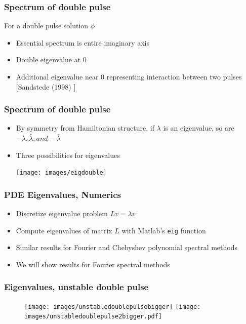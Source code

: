 \documentclass[16pt]{beamer}
\begin{document}
\begin{frame}
	\frametitle{Spectrum of double pulse}
	\fontsize{16}{7.2}\selectfont
	For a double pulse solution $\phi$
	\vspace{0.5cm}
	\begin{itemize}
		\item Essential spectrum is entire imaginary axis
		\vspace{0.5cm}
		\item Double eigenvalue at 0
		\vspace{0.5cm}
		\item Additional eigenvalue near 0 representing interaction between two pulses \footnotesize [Sandstede (1998) ]
	\end{itemize}
\end{frame}

\begin{frame}
	\frametitle{Spectrum of double pulse}
	\fontsize{16}{7.2}\selectfont
	\begin{itemize}
		\item By symmetry from Hamiltonian structure, if $\lambda$ is an eigenvalue, so are $-\lambda, \bar{\lambda}, and -\bar{\lambda}$
		\vspace{0.5cm}
		\item Three possibilities for eigenvalues
		\begin{center}
			\texttt{[image: images/eigdouble]}
		\end{center}
	\end{itemize}
\end{frame}

\begin{frame}
	\frametitle{PDE Eigenvalues, Numerics}
	\fontsize{16}{7.2}\selectfont
	\begin{itemize}
		\item Discretize eigenvalue problem $Lv = \lambda v$
		\vspace{0.5cm}
		\item Compute eigenvalues of matrix $L$ with Matlab's \texttt{eig} function
		\vspace{0.5cm}
		\item Similar results for Fourier and Chebyshev polynomial spectral methods
		\vspace{0.5cm}
		\item We will show results for Fourier spectral methods
	\end{itemize}
\end{frame}

\begin{frame}
	\frametitle{Eigenvalues, unstable double pulse}
	\fontsize{16}{7.2}\selectfont
	\begin{figure}
   		\texttt{[image: images/unstabledoublepulsebigger]}
   		\hfill
   		\texttt{[image: images/unstabledoublepulse2bigger.pdf]}
	\end{figure}
\end{frame}
\end{document}
